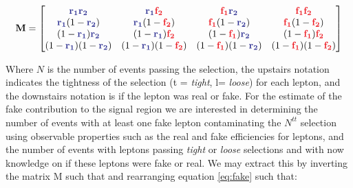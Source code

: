 \begin{equation}
\mathbf{M} = 
\begin{bmatrix}

\rone \rtwo          & \rone \ftwo         & \fone \rtwo         & \fone \ftwo \\
\rone (1-\rtwo )     & \rone (1-\ftwo )    & \fone (1- \rtwo )   & \fone (1- \ftwo ) \\
(1-\rone )\rtwo      & (1-\rone )\ftwo     & (1-\fone )\rtwo     & (1-\fone )\ftwo  \\
(1-\rone )(1-\rtwo ) & (1-\rone )(1-\ftwo )& (1-\fone )(1-\rtwo )& (1-\fone )(1-\ftwo )\\

\end{bmatrix}
\end{equation}

Where $N$ is the number of events passing the selection, the upstairs notation indicates the tightness of the selection (t = \emph{tight}, l= \emph{loose}) for each lepton, and the downstairs notation is if the lepton was real or fake. For the estimate of the fake contribution to the signal region we are interested in determining the number of events with at least one fake lepton contaminating the $N^{tt}$ selection using observable properties such as the real and fake efficiencies for leptons, and the number of events with leptons passing \emph{tight} or \emph{loose} selections and with now knowledge on if these leptons were fake or real. We may extract this by inverting the matrix M such that and rearranging equation \ref{eq:fake} such that:

